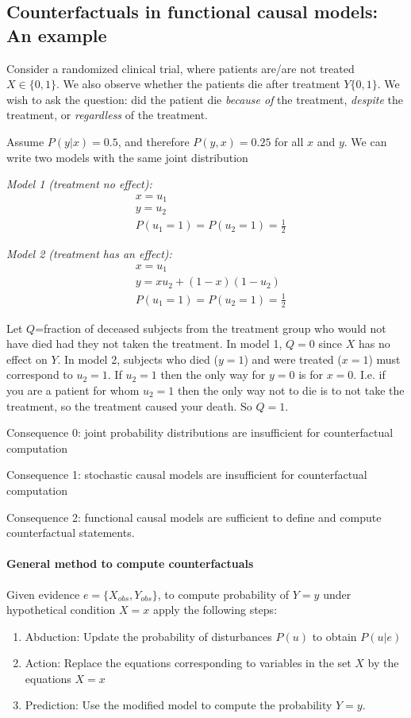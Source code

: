 \documentclass[11pt]{article}
\numberwithin{equation}{section}
\begin{document}
\subsection{Counterfactuals in functional causal models: An example}
Consider a randomized clinical trial, where patients are/are not treated $X \in \{0,1\}$. We also observe whether the patients die after treatment $Y\{0,1\}$. We wish to ask the question: did the patient die \textit{because of} the treatment, \textit{despite} the treatment, or \textit{regardless} of the treatment.

Assume $P(y|x) = 0.5$, and therefore $P(y,x)=0.25$ for all $x$ and $y$. We can write two models with the same joint distribution

\textit{Model 1 (treatment no effect):}
\begin{align}
&x=u_1\\
&y=u_2\\
&P(u_1=1) = P(u_2=1)= \frac{1}{2}
\end{align}


\textit{Model 2 (treatment has an effect):}
\begin{align}
&x=u_1\\
&y=xu_2 + (1-x)(1-u_2)\\
&P(u_1=1) = P(u_2=1)= \frac{1}{2}
\end{align}

Let $Q$=fraction of deceased subjects from the treatment group who would not have died had they not taken the treatment. In model 1, $Q=0$ since $X$ has no effect on $Y$. In model 2, subjects who died ($y=1$) and were treated ($x=1$) must correspond to $u_2=1$. If $u_2=1$ then the only way for $y=0$ is for $x=0$. I.e. if you are a patient for whom $u_2=1$ then the only way not to die is to not take the treatment, so the treatment caused your death. So $Q=1$.

Consequence 0: joint probability distributions are insufficient for counterfactual computation

Consequence 1: stochastic causal models are insufficient for counterfactual computation

Consequence 2: functional causal models are sufficient to define and compute counterfactual statements.

\paragraph{General method to compute counterfactuals}
Given evidence $e=\{X_{obs}, Y_{obs}\}$, to compute probability of $Y=y$ under hypothetical condition $X=x$ apply the following steps:
\begin{enumerate}[noitemsep]
\item Abduction: Update the probability of disturbances $P(u)$ to obtain $P(u|e)$
\item Action: Replace the equations corresponding to variables in the set $X$ by the equations $X=x$
\item Prediction: Use the modified model to compute the probability $Y=y$.
\end{enumerate}
\end{document}
